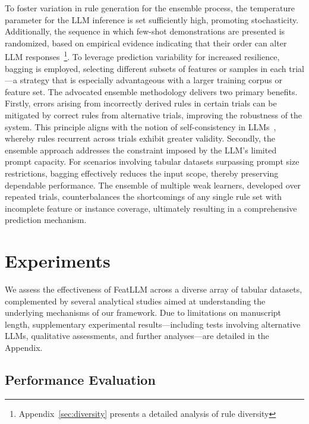 To foster variation in rule generation for the ensemble process, the temperature parameter for the LLM inference is set sufficiently high, promoting stochasticity. Additionally, the sequence in which few-shot demonstrations are presented is randomized, based on empirical evidence indicating that their order can alter LLM responses~\cite{lu2022fantastically}\footnote{Appendix~\ref{sec:diversity} presents a detailed analysis of rule diversity}. To leverage prediction variability for increased resilience, bagging is employed, selecting different subsets of features or samples in each trial—a strategy that is especially advantageous with a larger training corpus or feature set. The advocated ensemble methodology delivers two primary benefits. Firstly, errors arising from incorrectly derived rules in certain trials can be mitigated by correct rules from alternative trials, improving the robustness of the system. This principle aligns with the notion of self-consistency in LLMs~\cite{wang2022self}, whereby rules recurrent across trials exhibit greater validity. Secondly, the ensemble approach addresses the constraint imposed by the LLM's limited prompt capacity. For scenarios involving tabular datasets surpassing prompt size restrictions, bagging effectively reduces the input scope, thereby preserving dependable performance. The ensemble of multiple weak learners, developed over repeated trials, counterbalances the shortcomings of any single rule set with incomplete feature or instance coverage, ultimately resulting in a comprehensive prediction mechanism.

\section{Experiments}
We assess the effectiveness of \textsf{FeatLLM} across a diverse array of tabular datasets, complemented by several analytical studies aimed at understanding the underlying mechanisms of our framework. Due to limitations on manuscript length, supplementary experimental results—including tests involving alternative LLMs, qualitative assessments, and further analyses—are detailed in the Appendix.

\subsection{Performance Evaluation}

